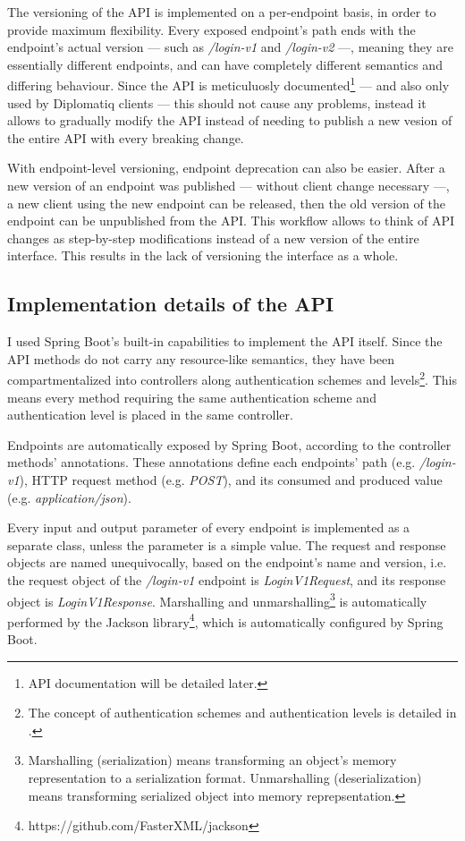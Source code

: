 The versioning of the API is implemented on a per-endpoint basis, in order to provide maximum flexibility. Every exposed endpoint's path ends with the endpoint's actual version — such as \emph{/login-v1} and \emph{/login-v2} —, meaning they are essentially different endpoints, and can have completely different semantics and differing behaviour. Since the API is meticuluosly documented\footnote{API documentation will be detailed later.} — and also only used by Diplomatiq clients — this should not cause any problems, instead it allows to gradually modify the API instead of needing to publish a new vesion of the entire API with every breaking change.

With endpoint-level versioning, endpoint deprecation can also be easier. After a new version of an endpoint was published — without client change necessary —, a new client using the new endpoint can be released, then the old version of the endpoint can be unpublished from the API. This workflow allows to think of API changes as step-by-step modifications instead of a new version of the entire interface. This results in the lack of versioning the interface as a whole.

\subsection{Implementation details of the API}

I used Spring Boot's built-in capabilities to implement the API itself. Since the API methods do not carry any resource-like semantics, they have been compartmentalized into controllers along authentication schemes and levels\footnote{The concept of authentication schemes and authentication levels is detailed in .}. This means every method requiring the same authentication scheme and authentication level is placed in the same controller.

Endpoints are automatically exposed by Spring Boot, according to the controller methods' annotations. These annotations define each endpoints' path (e.g. \emph{/login-v1}), HTTP request method (e.g. \emph{POST}), and its consumed and produced value (e.g. \emph{application/json}).

Every input and output parameter of every endpoint is implemented as a separate class, unless the parameter is a simple value. The request and response objects are named unequivocally, based on the endpoint's name and version, i.e. the request object of the \emph{/login-v1} endpoint is \emph{LoginV1Request}, and its response object is \emph{LoginV1Response}. Marshalling and unmarshalling\footnote{Marshalling (serialization) means transforming an object's memory representation to a serialization format. Unmarshalling (deserialization) means transforming serialized object into memory reprepsentation.} is automatically performed by the Jackson library\footnote{https://github.com/FasterXML/jackson}, which is automatically configured by Spring Boot.

